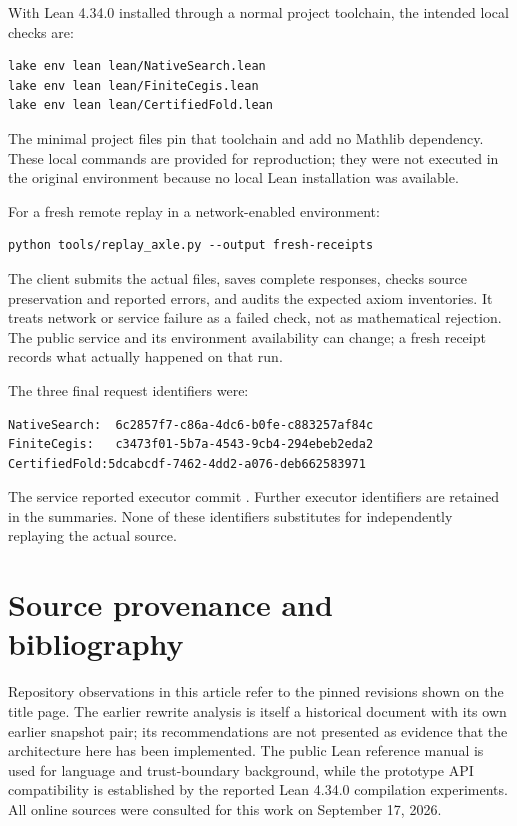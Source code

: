 \documentclass[11pt,letterpaper]{article}
\newcommand{\code}[1]{\texttt{\detokenize{#1}}}
\theoremstyle{definition}
\theoremstyle{remark}
\begin{document}
With Lean 4.34.0 installed through a normal project toolchain, the intended local checks are:
\Needspace{94pt}
\begin{lstlisting}[language={}]
lake env lean lean/NativeSearch.lean
lake env lean lean/FiniteCegis.lean
lake env lean lean/CertifiedFold.lean
\end{lstlisting}
The minimal project files pin that toolchain and add no Mathlib dependency. These local commands are provided for reproduction; they were not executed in the original environment because no local Lean installation was available.

For a fresh remote replay in a network-enabled environment:
\Needspace{72pt}
\begin{lstlisting}[language={}]
python tools/replay_axle.py --output fresh-receipts
\end{lstlisting}
The client submits the actual files, saves complete responses, checks source preservation and reported errors, and audits the expected axiom inventories. It treats network or service failure as a failed check, not as mathematical rejection. The public service and its environment availability can change; a fresh receipt records what actually happened on that run.

The three final request identifiers were:
\Needspace{94pt}
\begin{lstlisting}[language={}]
NativeSearch:  6c2857f7-c86a-4dc6-b0fe-c883257af84c
FiniteCegis:   c3473f01-5b7a-4543-9cb4-294ebeb2eda2
CertifiedFold:5dcabcdf-7462-4dd2-a076-deb662583971
\end{lstlisting}
The service reported executor commit \code{4e4d05b692e56b4d928ac95c4f783f411eadabba}. Further executor identifiers are retained in the summaries. None of these identifiers substitutes for independently replaying the actual source.

\section{Source provenance and bibliography}

Repository observations in this article refer to the pinned revisions shown on the title page. The earlier rewrite analysis is itself a historical document with its own earlier snapshot pair; its recommendations are not presented as evidence that the architecture here has been implemented. The public Lean reference manual is used for language and trust-boundary background, while the prototype API compatibility is established by the reported Lean 4.34.0 compilation experiments. All online sources were consulted for this work on September 17, 2026.
\end{document}
